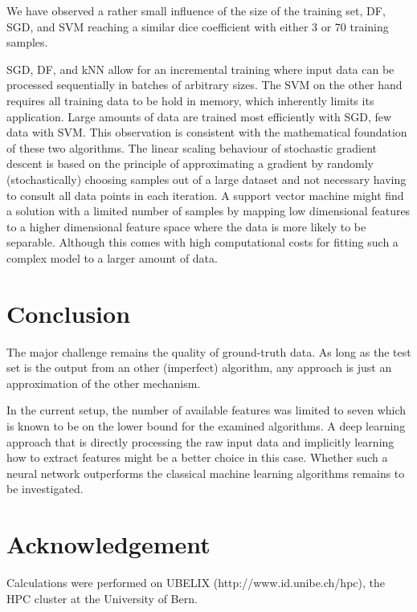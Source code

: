 \documentclass[journal]{IEEEtran}
\begin{document}
We have observed a rather small influence of the size of the training set, DF, SGD, and SVM reaching a similar dice coefficient with either 3 or 70 training samples.

SGD, DF, and kNN allow for an incremental training where input data can be processed sequentially in batches of arbitrary sizes. The SVM on the other hand requires all training data to be hold in memory, which inherently limits its application. Large amounts of data are trained most efficiently with SGD, few data with SVM. This observation is consistent with the mathematical foundation of these two algorithms. The linear scaling behaviour of stochastic gradient descent is based on the principle of approximating a gradient by randomly (stochastically) choosing samples out of a large dataset and not necessary having to consult all data points in each iteration. A support vector machine might find a solution with a limited number of samples by mapping low dimensional features to a higher dimensional feature space where the data is more likely to be separable. Although this comes with high computational costs for fitting such a complex model to a larger amount of data.

\section{Conclusion}
The major challenge remains the quality of ground-truth data. As long as the test set is the output from an other (imperfect) algorithm, any approach is just an approximation of the other mechanism.

In the current setup, the number of available features was limited to seven which is known to be on the lower bound for the examined algorithms. A deep learning approach that is directly processing the raw input data and implicitly learning how to extract features might be a better choice in this case. Whether such a neural network outperforms the classical machine learning algorithms remains to be investigated.

\section*{Acknowledgement}
Calculations were performed on UBELIX (http://www.id.unibe.ch/hpc), the HPC cluster at the University of Bern.



\end{document}
